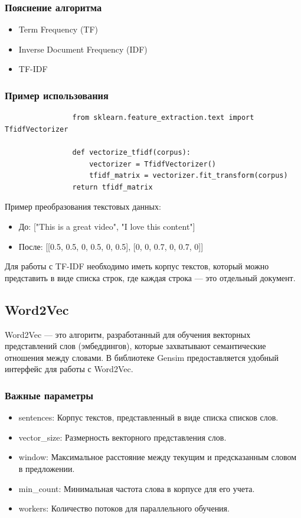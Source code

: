 		\subsubsection{Пояснение алгоритма}
			\begin{itemize}
				\item Term Frequency (TF)
				\item Inverse Document Frequency (IDF)
				\item TF-IDF
			\end{itemize}
			
				
		\subsubsection{Пример использования}
			\begin{verbatim}
				from sklearn.feature_extraction.text import TfidfVectorizer
	
				def vectorize_tfidf(corpus):
					vectorizer = TfidfVectorizer()
					tfidf_matrix = vectorizer.fit_transform(corpus)
				return tfidf_matrix
			\end{verbatim}

			Пример преобразования текстовых данных:
			\begin{itemize}
				\item До: ["This is a great video", "I love this content"]
				\item После: [[0.5, 0.5, 0, 0.5, 0, 0.5], [0, 0, 0.7, 0, 0.7, 0]]
			\end{itemize}
			
			Для работы с TF-IDF необходимо иметь корпус текстов, который можно представить в виде списка строк, где каждая строка — это отдельный документ.
			
 
	\subsection{Word2Vec}
 		Word2Vec — это алгоритм, разработанный для обучения векторных представлений слов (эмбеддингов), которые захватывают семантические отношения между словами. В библиотеке Gensim предоставляется удобный интерфейс для работы с Word2Vec.
		
		\subsubsection{Важные параметры}	
			\begin{itemize}
				\item sentences: Корпус текстов, представленный в виде списка списков слов.
				\item vector\_size: Размерность векторного представления слов.
				\item window: Максимальное расстояние между текущим и предсказанным словом в предложении.
				\item min\_count: Минимальная частота слова в корпусе для его учета.
				\item workers: Количество потоков для параллельного обучения.
			\end{itemize}
		
